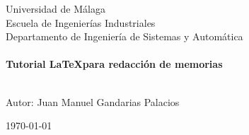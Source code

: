 \begin{titlepage}
\begin{center}
\vspace{2cm}
\textsf{\huge Universidad de M\'alaga}\\[1.5cm] %
\textsf{\LARGE Escuela de Ingenierías Industriales}\\[0.5cm] %
\textsf{\Large Departamento de Ingeniería de Sistemas y Automática}\\[0.5cm] %

\vspace{1cm}
\HRule \\[0.4cm]
{ \huge \bfseries \textsf{Tutorial \LaTeX para redacción de memorias}}\\[0.4cm] %
\HRule \\[1.5cm]
 

\vspace{0.2cm}

{\Large \textsf{Autor: Juan Manuel Gandarias Palacios}} 

\end{center}

\vspace{1cm}



\vfill
\center
\textsf{{\large \today}}\\[2cm] %


\vfill %

\end{titlepage}